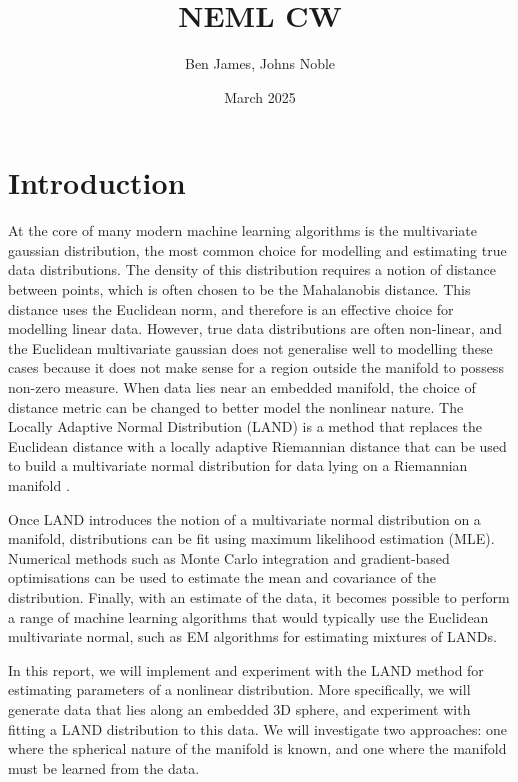 \documentclass{article}
\title{NEML CW}
\author{Ben James, Johns Noble}
\date{March 2025}
\begin{document}
\maketitle
\tableofcontents
\section{Introduction}

At the core of many modern machine learning algorithms is the multivariate gaussian distribution, the most common choice for modelling and estimating true data distributions. The density of this distribution requires a notion of distance between points, which is often chosen to be the Mahalanobis distance. This distance uses the Euclidean norm, and therefore is an effective choice for modelling linear data. However, true data distributions are often non-linear, and the Euclidean multivariate gaussian does not generalise well to modelling these cases because it does not make sense for a region outside the manifold to possess non-zero measure. When data lies near an embedded manifold, the choice of distance metric can be changed to better model the nonlinear nature. The Locally Adaptive Normal Distribution (LAND) \cite{arvanitidisLocallyAdaptiveNormal2016} is a method that replaces the Euclidean distance with a locally adaptive Riemannian distance that can be used to build a multivariate normal distribution for data lying on a Riemannian manifold \cite{manfredoRiemannianGeometry1992}.

Once LAND introduces the notion of a multivariate normal distribution on a manifold, distributions can be fit using maximum likelihood estimation (MLE). Numerical methods such as Monte Carlo integration and gradient-based optimisations can be used to estimate the mean and covariance of the distribution. Finally, with an estimate of the data, it becomes possible to perform a range of machine learning algorithms that would typically use the Euclidean multivariate normal, such as EM algorithms for estimating mixtures of LANDs.

In this report, we will implement and experiment with the LAND method for estimating parameters of a nonlinear distribution. More specifically, we will generate data that lies along an embedded 3D sphere, and experiment with fitting a LAND distribution to this data. We will investigate two approaches: one where the spherical nature of the manifold is known, and one where the manifold must be learned from the data.
\end{document}
